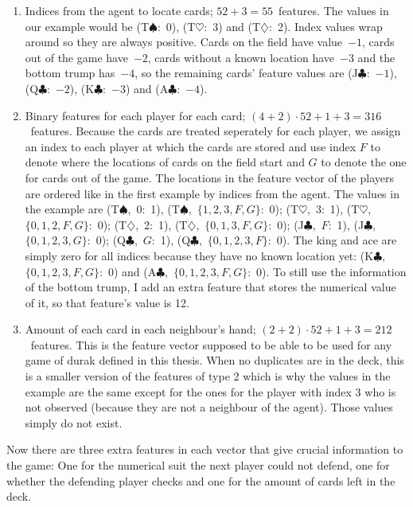 \documentclass[a4paper,titlepage]{article}
\begin{document}
\begin{enumerate}
  \item Indices from the agent to locate cards; $52 + 3 = 55$~features. The values in our example would be (T$\spadesuit$:~0), (T$\heartsuit$:~3) and (T$\diamondsuit$:~2). Index values wrap around so they are always positive. Cards on the field have value~$-1$, cards out of the game have~$-2$, cards without a known location have~$-3$ and the bottom trump has~$-4$, so the remaining cards' feature values are (J$\clubsuit$:~$-1$), (Q$\clubsuit$:~$-2$), (K$\clubsuit$:~$-3$) and (A$\clubsuit$:~$-4$).
  \item Binary features for each player for each card; $(4 + 2) \cdot 52  + 1 + 3 = 316$~features. Because the cards are treated seperately for each player, we assign an index to each player at which the cards are stored and use index $F$ to denote where the locations of cards on the field start and $G$ to denote the one for cards out of the game. The locations in the feature vector of the players are ordered like in the first example by indices from the agent. The values in the example are (T$\spadesuit$,~0:~1), (T$\spadesuit$,~$\{1, 2, 3, F, G\}$:~0); (T$\heartsuit$,~3:~1), (T$\heartsuit$,~$\{0, 1, 2, F, G\}$:~0); (T$\diamondsuit$,~2:~1), (T$\diamondsuit$,~$\{0, 1, 3, F, G\}$:~0); (J$\clubsuit$,~$F$:~1), (J$\clubsuit$,~$\{0, 1, 2, 3, G\}$:~0); (Q$\clubsuit$,~$G$:~1), (Q$\clubsuit$,~$\{0, 1, 2, 3, F\}$:~0).
  The king and ace are simply zero for all indices because they have no known location yet: (K$\clubsuit$,~$\{0, 1, 2, 3, F, G\}$:~0) and (A$\clubsuit$,~$\{0, 1, 2, 3, F, G\}$:~0). To still use the information of the bottom trump, I add an extra feature that stores the numerical value of it, so that feature's value is 12.
  \item Amount of each card in each neighbour's hand; $(2 + 2) \cdot 52 + 1 + 3 = 212$~features. This is the feature vector supposed to be able to be used for any game of durak defined in this thesis. When no duplicates are in the deck, this is a smaller version of the features of type 2 which is why the values in the example are the same except for the ones for the player with index 3 who is not observed (because they are not a neighbour of the agent). Those values simply do not exist.
\end{enumerate}
Now there are three extra features in each vector that give crucial information to the game: One for the numerical suit the next player could not defend, one for whether the defending player checks and one for the amount of cards left in the deck.
\end{document}
